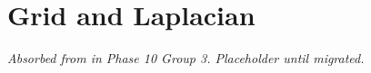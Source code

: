 \chapter{Grid and Laplacian}
\label{chap:grid-and-laplacian}

\textit{Absorbed from  in
Phase 10 Group 3. Placeholder until migrated.}
